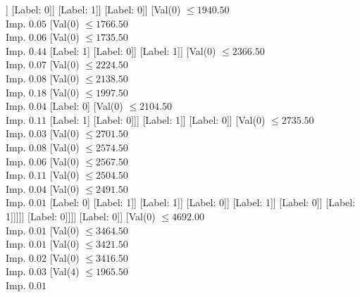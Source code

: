 \documentclass[margin=10pt]{standalone}
\begin{document}
\begin{forest}
						[Val($0$) $ \leq 1253.50$ \\ Imp. $0.03$
							[Val($0$) $ \leq 1003.00$ \\ Imp. $0.06$
								[Val($0$) $ \leq 961.00$ \\ Imp. $0.18$
									[Val($0$) $ \leq 784.50$ \\ Imp. $0.08$
										[Val($0$) $ \leq 778.50$ \\ Imp. $0.18$
											[Label: 0]
											[Label: 1]]
										[Label: 0]]
									[Label: 1]]
								[Label: 0]]
							[Val($0$) $ \leq 1940.50$ \\ Imp. $0.05$
								[Val($0$) $ \leq 1766.50$ \\ Imp. $0.06$
									[Val($0$) $ \leq 1735.50$ \\ Imp. $0.44$
										[Label: 1]
										[Label: 0]]
									[Label: 1]]
								[Val($0$) $ \leq 2366.50$ \\ Imp. $0.07$
									[Val($0$) $ \leq 2224.50$ \\ Imp. $0.08$
										[Val($0$) $ \leq 2138.50$ \\ Imp. $0.18$
											[Val($0$) $ \leq 1997.50$ \\ Imp. $0.04$
												[Label: 0]
												[Val($0$) $ \leq 2104.50$ \\ Imp. $0.11$
													[Label: 1]
													[Label: 0]]]
											[Label: 1]]
										[Label: 0]]
									[Val($0$) $ \leq 2735.50$ \\ Imp. $0.03$
										[Val($0$) $ \leq 2701.50$ \\ Imp. $0.08$
											[Val($0$) $ \leq 2574.50$ \\ Imp. $0.06$
												[Val($0$) $ \leq 2567.50$ \\ Imp. $0.11$
													[Val($0$) $ \leq 2504.50$ \\ Imp. $0.04$
														[Val($0$) $ \leq 2491.50$ \\ Imp. $0.01$
															[Label: 0]
															[Label: 1]]
														[Label: 1]]
													[Label: 0]]
												[Label: 1]]
											[Label: 0]]
										[Label: 1]]]]]
						[Label: 0]]]]
			[Label: 0]]
		[Val($0$) $ \leq 4692.00$ \\ Imp. $0.01$
			[Val($0$) $ \leq 3464.50$ \\ Imp. $0.01$
				[Val($0$) $ \leq 3421.50$ \\ Imp. $0.02$
					[Val($0$) $ \leq 3416.50$ \\ Imp. $0.03$
						[Val($4$) $ \leq 1965.50$ \\ Imp. $0.01$

\end{forest}
\end{document}
